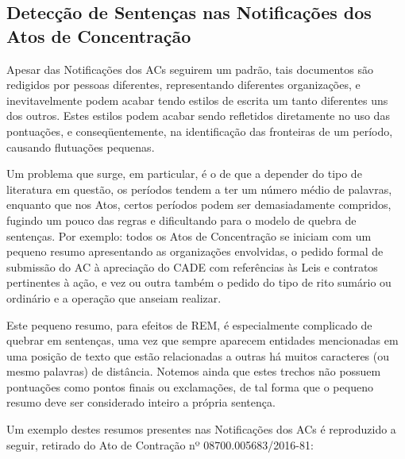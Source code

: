 \documentclass[11pt]{report}
\begin{document}
\subsection{Detecção de Sentenças nas Notificações dos Atos de Concentração}

\indent\indent Apesar das Notificações dos ACs seguirem um padrão, tais documentos são redigidos por pessoas diferentes, representando diferentes organizações, e inevitavelmente
podem acabar tendo estilos de escrita um tanto diferentes uns dos outros. Estes estilos podem acabar sendo refletidos diretamente no uso das pontuações, e conseqüentemente,
na identificação das fronteiras de um período, causando flutuações pequenas.

Um problema que surge, em particular, é o de que a depender do tipo de literatura em questão, os períodos tendem a ter um número médio de palavras, enquanto que
nos Atos, certos períodos podem ser demasiadamente compridos, fugindo um pouco das regras e dificultando para o modelo de quebra de sentenças.
Por exemplo: todos os Atos de Concentração se iniciam com um pequeno resumo apresentando as organizações envolvidas, o pedido formal de submissão do AC à apreciação do CADE
com referências às Leis e contratos pertinentes à ação, e vez ou outra também o pedido do tipo de rito sumário ou ordinário e a operação que anseiam realizar.

Este pequeno resumo, para efeitos de REM, é especialmente complicado de quebrar em sentenças, uma vez que sempre aparecem entidades mencionadas
em uma posição de texto que estão relacionadas a outras há muitos caracteres (ou mesmo palavras) de distância. Notemos ainda que estes trechos não possuem pontuações como pontos finais ou
exclamações, de tal forma que o pequeno resumo deve ser considerado inteiro a própria sentença.

Um exemplo destes resumos presentes nas Notificações dos ACs é reproduzido a seguir, retirado do Ato de Contração nº 08700.005683/2016-81:
\end{document}
